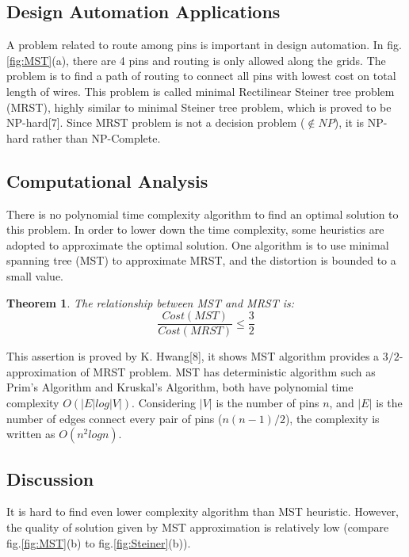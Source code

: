 \documentclass[11pt,twoside, onecolumn]{IEEEtran}
\newtheorem{Theorem}{Theorem}[section]
\begin{document}
\subsection{Design Automation Applications} 
A problem related to route among pins is important in design automation.
In fig.\ref{fig:MST}(a), there are 4 pins and routing is only allowed along the grids.
The problem is to find a path of routing to connect all pins with lowest cost on total length of
wires. This problem is called minimal Rectilinear Steiner tree problem (MRST), highly similar to 
minimal Steiner tree problem, which is proved to be NP-hard[7]. Since MRST problem is not a 
decision problem ($\notin NP$), it is NP-hard rather than NP-Complete.

\subsection{Computational Analysis}
There is no polynomial time complexity algorithm to find an optimal solution to this problem.
In order to lower down the time complexity, some heuristics are adopted to approximate the 
optimal solution. One algorithm is to use minimal spanning tree (MST) to approximate MRST,
and the distortion is bounded to a small value.

\begin{Theorem}
The relationship between MST and MRST is:
$$\frac{Cost(MST)}{Cost(MRST)} \leq \frac{3}{2}$$
\end{Theorem}

This assertion is proved by K. Hwang[8], it shows MST algorithm provides a $3/2$-approximation of
MRST problem. MST has deterministic algorithm such as Prim's Algorithm and Kruskal's Algorithm,
both have polynomial time complexity $O(|E|log|V|)$. Considering $|V|$ is the number of pins $n$,
and $|E|$ is the number of edges connect every pair of pins ($n(n-1)/2$), the complexity is
written as $O(n^2logn)$.

\subsection{Discussion}
It is hard to find even lower complexity algorithm than MST heuristic. However, the quality
of solution given by MST approximation is relatively low (compare fig.\ref{fig:MST}(b) to fig.\ref{fig:Steiner}(b)).
\end{document}
